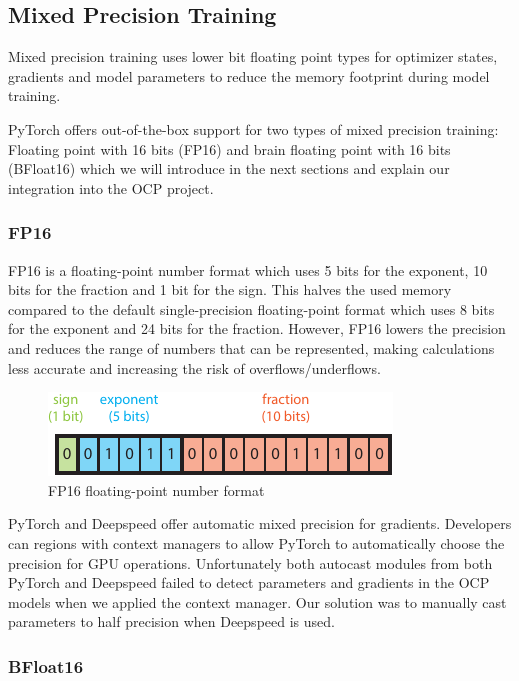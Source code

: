 \subsection{Mixed Precision Training}

Mixed precision training uses lower bit floating point types for optimizer states, gradients and model parameters to 
reduce the memory footprint during model training. 

PyTorch offers out-of-the-box support for two types of mixed precision training: Floating point with 16 bits (FP16) and 
brain floating point with 16 bits (BFloat16) which we will introduce in the next sections and explain our integration 
into the OCP project.

\subsubsection{FP16}

FP16 is a floating-point number format which uses 5 bits for the exponent, 10 bits for the fraction and 1 bit for the 
sign. This halves the used memory compared to the default single-precision floating-point format which uses 8 bits 
for the exponent and 24 bits for the fraction. However, FP16 lowers the precision and reduces the range of numbers 
that can be represented, making calculations less accurate and increasing the risk of overflows/underflows.

\begin{figure}[H]
    \centering
    \includegraphics{figures/mixed_precision/float16.pdf}
    \caption{FP16 floating-point number format}
\end{figure}

PyTorch and Deepspeed offer automatic mixed precision for gradients. Developers can regions with context managers 
to allow PyTorch to automatically choose the precision for GPU operations. Unfortunately both autocast modules from 
both PyTorch and Deepspeed failed to detect parameters and gradients in the OCP models when we applied the context 
manager. Our solution was to manually cast parameters to half precision when Deepspeed is used. 

\subsubsection{BFloat16}

